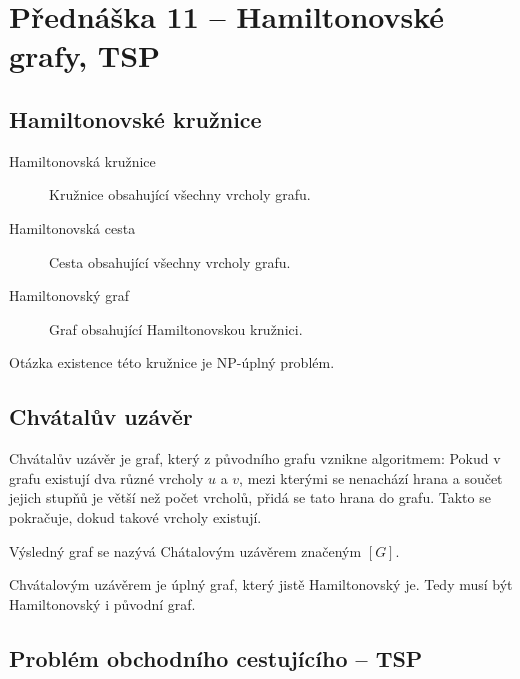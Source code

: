 \section{Přednáška 11 -- Hamiltonovské grafy, TSP}

\subsection{Hamiltonovské kružnice}

\begin{description}
    \item[Hamiltonovská kružnice] Kružnice obsahující všechny vrcholy grafu.
    \item[Hamiltonovská cesta] Cesta obsahující všechny vrcholy grafu.
    \item[Hamiltonovský graf] Graf obsahující Hamiltonovskou kružnici.
\end{description}

Otázka existence této kružnice je NP-úplný problém.

\subsection{Chvátalův uzávěr}


Chvátalův uzávěr je graf, který z původního grafu vznikne algoritmem:
Pokud v grafu existují dva různé vrcholy $u$ a $v$, mezi kterými se nenachází hrana a součet jejich stupňů je větší než počet vrcholů, přidá se tato hrana do grafu.
Takto se pokračuje, dokud takové vrcholy existují.

Výsledný graf se nazývá Chátalovým uzávěrem značeným $[G]$.



Chvátalovým uzávěrem je úplný graf, který jistě Hamiltonovský je.
Tedy musí být Hamiltonovský i původní graf.


\subsection{Problém obchodního cestujícího -- TSP}

